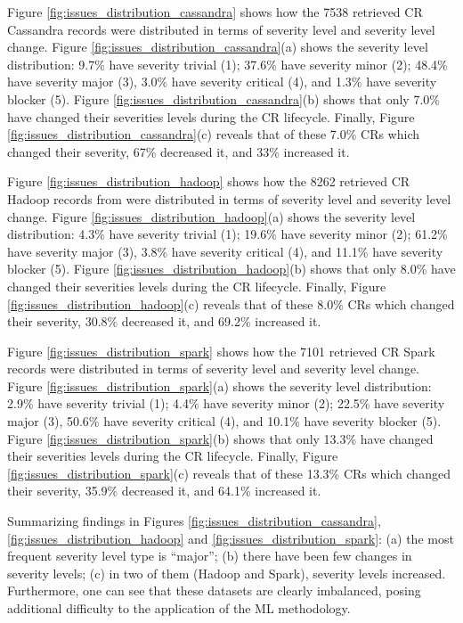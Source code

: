 Figure \ref{fig:issues_distribution_cassandra} shows how the 7538 retrieved CR Cassandra records were distributed in terms of severity level and severity level change. Figure \ref{fig:issues_distribution_cassandra}(a) shows the severity level distribution: 9.7\% have severity trivial (1); 37.6\% have severity minor (2); 48.4\% have severity major (3), 3.0\% have severity critical (4), and 1.3\% have severity blocker (5). Figure \ref{fig:issues_distribution_cassandra}(b) shows that only 7.0\% have changed their severities levels during the CR lifecycle. Finally, Figure \ref{fig:issues_distribution_cassandra}(c) reveals that of these 7.0\% CRs which changed their severity, 67\% decreased it, and 33\% increased it. 

Figure \ref{fig:issues_distribution_hadoop} shows how the 8262 retrieved CR Hadoop records from were distributed in terms of severity level and severity level change. Figure \ref{fig:issues_distribution_hadoop}(a) shows the severity level distribution: 4.3\% have severity trivial (1); 19.6\% have severity minor (2); 61.2\% have severity major (3), 3.8\% have severity critical (4), and 11.1\% have severity blocker (5). Figure \ref{fig:issues_distribution_hadoop}(b) shows that only 8.0\% have changed their severities levels during the CR lifecycle. Finally, Figure \ref{fig:issues_distribution_hadoop}(c) reveals that of these 8.0\% CRs which changed their severity, 30.8\% decreased it, and 69.2\% increased it. 

Figure \ref{fig:issues_distribution_spark} shows how the 7101 retrieved CR Spark records were distributed in terms of severity level and severity level change. Figure \ref{fig:issues_distribution_spark}(a) shows the severity level distribution: 2.9\% have severity trivial (1); 4.4\% have severity minor (2); 22.5\% have severity major (3), 50.6\% have severity critical (4), and 10.1\% have severity blocker (5). Figure \ref{fig:issues_distribution_spark}(b) shows that only 13.3\% have changed their severities levels during the CR lifecycle. Finally, Figure \ref{fig:issues_distribution_spark}(c) reveals that of these 13.3\% CRs which changed their severity, 35.9\% decreased it, and 64.1\% increased it. 

Summarizing findings in Figures \ref{fig:issues_distribution_cassandra}, \ref{fig:issues_distribution_hadoop} and  \ref{fig:issues_distribution_spark}: (a) the most frequent severity level type is ``major''; (b) there have been few changes in severity levels; (c) in two of them (Hadoop and Spark), severity levels increased. Furthermore, one can see that these datasets are clearly imbalanced, posing additional difficulty to the application of the ML methodology. 

